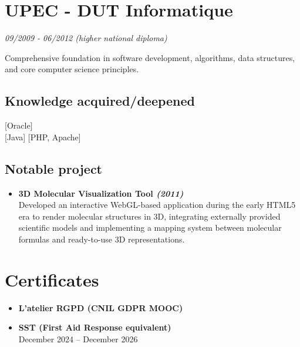 {    %

    \section[\faMortarBoard]{UPEC - DUT Informatique}
    \textit{09/2009 - 06/2012 (higher national diploma)}

    Comprehensive foundation in software development, algorithms, data structures, and core computer science principles.

    \subsection{Knowledge acquired/deepened}
      [Oracle] \\
     [Java] [PHP, Apache]

    \subsection{Notable project}
    \begin{itemize}[label=\faTrophy]
        \item \textbf{3D Molecular Visualization Tool \textit{(2011)}}\\
        Developed an interactive WebGL-based application during the early HTML5 era to render molecular structures in 3D,
        integrating externally provided scientific models and implementing a mapping system between molecular formulas and ready-to-use 3D representations.
    \end{itemize}


    \section[\faCertificate]{Certificates}

    \begin{itemize}[label=\faCertificate]
        \item \textbf{L’atelier RGPD (CNIL GDPR MOOC)}
        \item \textbf{SST (First Aid Response equivalent)}\\
        December 2024 – December 2026
    \end{itemize}

}

\makebody
